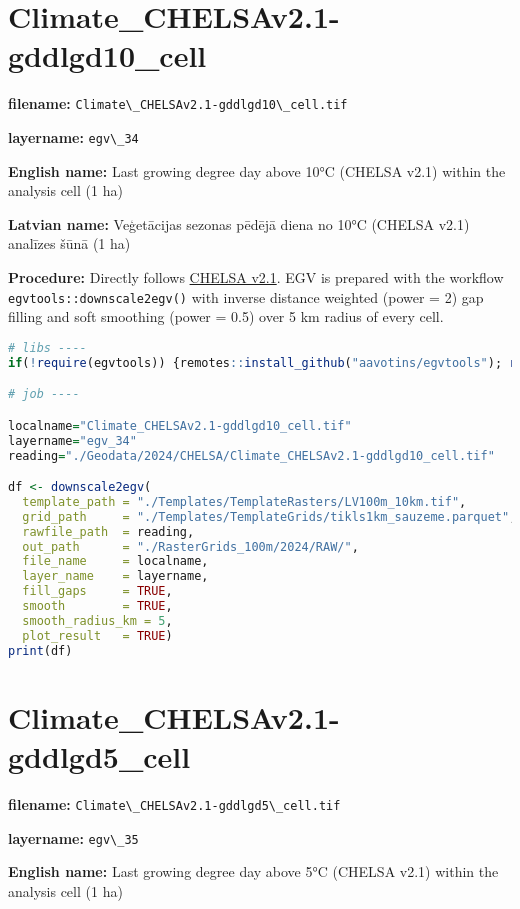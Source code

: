 \documentclass[
]{book}
\newcommand{\passthrough}[1]{#1}
\begin{document}
\section{Climate\_CHELSAv2.1-gddlgd10\_cell}\label{ch06.034}

\textbf{filename:} \passthrough{\lstinline!Climate\_CHELSAv2.1-gddlgd10\_cell.tif!}

\textbf{layername:} \passthrough{\lstinline!egv\_34!}

\textbf{English name:} Last growing degree day above 10°C (CHELSA v2.1) within the analysis cell (1 ha)

\textbf{Latvian name:} Veģetācijas sezonas pēdējā diena no 10°C (CHELSA v2.1) analīzes šūnā (1 ha)

\textbf{Procedure:} Directly follows \hyperref[Ch04.11]{CHELSA v2.1}. EGV is prepared with the
workflow \passthrough{\lstinline!egvtools::downscale2egv()!} with inverse distance weighted (power = 2)
gap filling and soft smoothing (power = 0.5) over 5 km radius of every cell.

\begin{lstlisting}[language=R]
# libs ----
if(!require(egvtools)) {remotes::install_github("aavotins/egvtools"); require(egvtools)}

# job ----

localname="Climate_CHELSAv2.1-gddlgd10_cell.tif"
layername="egv_34"
reading="./Geodata/2024/CHELSA/Climate_CHELSAv2.1-gddlgd10_cell.tif"

df <- downscale2egv(
  template_path = "./Templates/TemplateRasters/LV100m_10km.tif",
  grid_path     = "./Templates/TemplateGrids/tikls1km_sauzeme.parquet",
  rawfile_path  = reading,
  out_path      = "./RasterGrids_100m/2024/RAW/",
  file_name     = localname,
  layer_name    = layername,
  fill_gaps     = TRUE,
  smooth        = TRUE,
  smooth_radius_km = 5,
  plot_result   = TRUE)
print(df)
\end{lstlisting}

\section{Climate\_CHELSAv2.1-gddlgd5\_cell}\label{ch06.035}

\textbf{filename:} \passthrough{\lstinline!Climate\_CHELSAv2.1-gddlgd5\_cell.tif!}

\textbf{layername:} \passthrough{\lstinline!egv\_35!}

\textbf{English name:} Last growing degree day above 5°C (CHELSA v2.1) within the analysis cell (1 ha)
\end{document}
